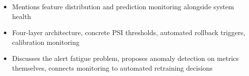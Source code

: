 \begin{interviewq}
\goodgreat
\begin{itemize}
    \item {} Mentions feature distribution and prediction monitoring alongside system health
    \item {} Four-layer architecture, concrete PSI thresholds, automated rollback triggers, calibration monitoring
    \item {} Discusses the alert fatigue problem, proposes anomaly detection on metrics themselves, connects monitoring to automated retraining decisions
\end{itemize}

\end{interviewq}

